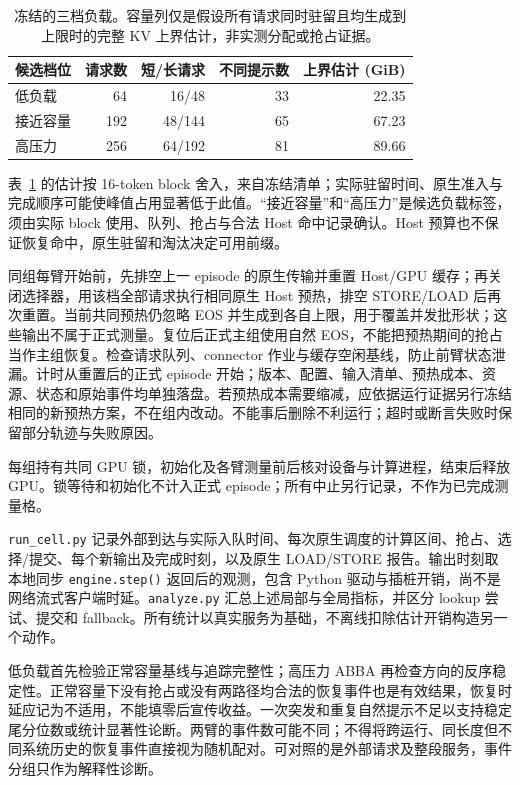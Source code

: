 \documentclass[UTF8,fontset=fandol,a4paper,10pt]{ctexart}
\newcommand{\code}[1]{\nolinkurl{#1}}
\begin{document}
\begin{table}[ht]
\centering\small
\caption{冻结的三档负载。容量列仅是假设所有请求同时驻留且均生成到上限时的完整 KV 上界估计，非实测分配或抢占证据。}
\label{tab:loads}
\begin{tabular}{@{}lrrrr@{}}
\toprule
候选档位 & 请求数 & 短/长请求 & 不同提示数 & 上界估计 (GiB) \\
\midrule
低负载 & 64 & 16/48 & 33 & 22.35 \\
接近容量 & 192 & 48/144 & 65 & 67.23 \\
高压力 & 256 & 64/192 & 81 & 89.66 \\
\bottomrule
\end{tabular}
\end{table}

表~\ref{tab:loads} 的估计按 16-token block 舍入，来自冻结清单；实际驻留时间、原生准入与完成顺序可能使峰值占用显著低于此值。“接近容量”和“高压力”是候选负载标签，须由实际 block 使用、队列、抢占与合法 Host 命中记录确认。Host 预算也不保证恢复命中，原生驻留和淘汰决定可用前缀。

同组每臂开始前，先排空上一 episode 的原生传输并重置 Host/GPU 缓存；再关闭选择器，用该档全部请求执行相同原生 Host 预热，排空 STORE/LOAD 后再次重置。当前共同预热仍忽略 EOS 并生成到各自上限，用于覆盖并发批形状；这些输出不属于正式测量。复位后正式主组使用自然 EOS，不能把预热期间的抢占当作主组恢复。检查请求队列、connector 作业与缓存空闲基线，防止前臂状态泄漏。计时从重置后的正式 episode 开始；版本、配置、输入清单、预热成本、资源、状态和原始事件均单独落盘。若预热成本需要缩减，应依据运行证据另行冻结相同的新预热方案，不在组内改动。不能事后删除不利运行；超时或断言失败时保留部分轨迹与失败原因。

每组持有共同 GPU 锁，初始化及各臂测量前后核对设备与计算进程，结束后释放 GPU。锁等待和初始化不计入正式 episode；所有中止另行记录，不作为已完成测量格。

\code{run_cell.py} 记录外部到达与实际入队时间、每次原生调度的计算区间、抢占、选择/提交、每个新输出及完成时刻，以及原生 LOAD/STORE 报告。输出时刻取本地同步 \code{engine.step()} 返回后的观测，包含 Python 驱动与插桩开销，尚不是网络流式客户端时延。\code{analyze.py} 汇总上述局部与全局指标，并区分 lookup 尝试、提交和 fallback。所有统计以真实服务为基础，不离线扣除估计开销构造另一个动作。

低负载首先检验正常容量基线与追踪完整性；高压力 ABBA 再检查方向的反序稳定性。正常容量下没有抢占或没有两路径均合法的恢复事件也是有效结果，恢复时延应记为不适用，不能填零后宣传收益。一次突发和重复自然提示不足以支持稳定尾分位数或统计显著性论断。两臂的事件数可能不同；不得将跨运行、同长度但不同系统历史的恢复事件直接视为随机配对。可对照的是外部请求及整段服务，事件分组只作为解释性诊断。
\end{document}
